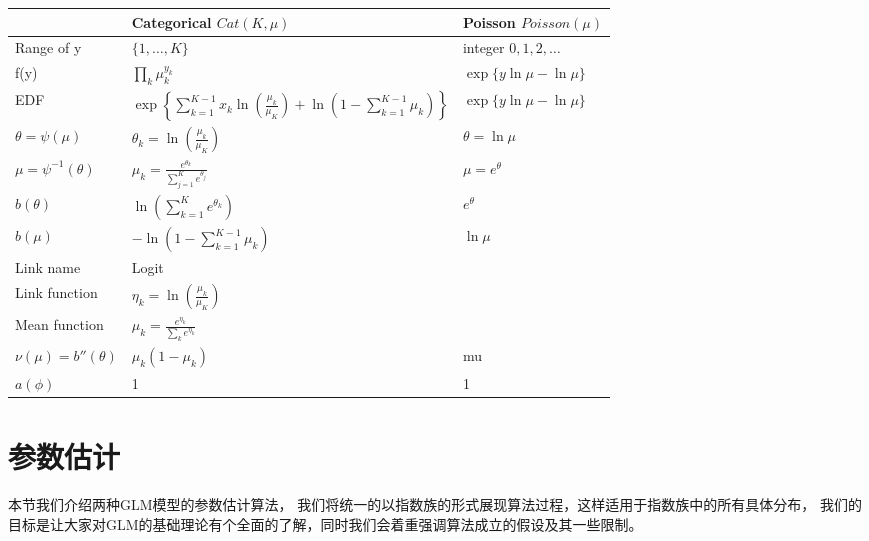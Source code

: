 \documentclass[letterpaper,10pt,english]{sphinxmanual}
\begin{document}
\begin{savenotes}\sphinxattablestart
\centering
{}
\sphinxthecaptionisattop
{}\label{\detokenize{_u5e7f_u4e49_u7ebf_u6027_u6a21_u578b/content:id14}}
\sphinxaftertopcaption
\begin{tabulary}{\linewidth}[t]{|T|T|T|}
\hline
\sphinxstyletheadfamily &\sphinxstyletheadfamily 
Categorical \(Cat(K,\mu)\)
&\sphinxstyletheadfamily 
Poisson \(Poisson(\mu)\)
\\
\hline
Range of y
&
\(\{1,\dots,K\}\)
&
integer \(0,1,2,\dots\)
\\
\hline
f(y)
&
\(\prod_{k}\mu_k^{y_k}\)
&
\(\exp\{y\ln \mu - \ln\mu\}\)
\\
\hline
EDF
&
\(\exp \left \{ \sum_{k=1}^{K-1} x_k \ln \left ( \frac{\mu_k}{ \mu_K} \right )+ \ln \left  (1-\sum_{k=1}^{K-1} \mu_k \right ) \right \}\)
&
\(\exp\{y\ln \mu - \ln\mu\}\)
\\
\hline
\(\theta=\psi(\mu)\)
&
\(\theta_k=\ln \left ( \frac{\mu_k}{\mu_K} \right )\)
&
\(\theta=\ln \mu\)
\\
\hline
\(\mu=\psi^{-1}(\theta)\)
&
\(\mu_k = \frac{e^{\theta_k}}{\sum_{j=1}^K e^{\theta_j}}\)
&
\(\mu=e^{\theta}\)
\\
\hline
\(b(\theta)\)
&
\(\ln \left (  \sum_{k=1}^K e^{\theta_k}  \right )\)
&
\(e^{\theta}\)
\\
\hline
\(b(\mu)\)
&
\(- \ln \left  (1-\sum_{k=1}^{K-1} \mu_k \right )\)
&
\(\ln\mu\)
\\
\hline
Link name
&
Logit
&\\
\hline
Link function
&
\(\eta_k=\ln \left( \frac{\mu_k}{\mu_K} \right)\)
&\\
\hline
Mean function
&
\(\mu_k=\frac{e^{\eta_k}}{\sum_k e^{\eta_k}}\)
&\\
\hline
\(\nu(\mu)=b''(\theta)\)
&
\(\mu_k(1-\mu_k)\)
&
mu
\\
\hline
\(a(\phi)\)
&
1
&
1
\\
\hline
\end{tabulary}
\par
\sphinxattableend\end{savenotes}


\chapter{参数估计}
\label{\detokenize{_u5e7f_u4e49_u7ebf_u6027_u6a21_u578b/estimate:id1}}\label{\detokenize{_u5e7f_u4e49_u7ebf_u6027_u6a21_u578b/estimate::doc}}
本节我们介绍两种GLM模型的参数估计算法，
我们将统一的以指数族的形式展现算法过程，这样适用于指数族中的所有具体分布，
我们的目标是让大家对GLM的基础理论有个全面的了解，同时我们会着重强调算法成立的假设及其一些限制。
\end{document}
